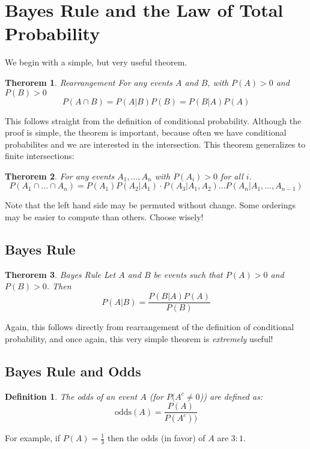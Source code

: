 \documentclass[12pt]{article} %
\newtheorem{defn}{Definition}
\newtheorem{thm}{Therorem}
\begin{document}
\section{Bayes Rule and the Law of Total Probability}
We begin with a simple, but very useful theorem.\\

\begin{thm}{Rearrangement}
For any events $A$ and $B$, with $P(A)>0$ and $P(B)>0$
$$P(A\cap B) = P(A|B)P(B) = P(B|A)P(A)$$
\end{thm}
This follows straight from the definition of conditional probability. Although the proof is simple, the theorem is important, because often we have conditional probabilites and we are interested in the intersection. This theorem generalizes to finite intersections:
\begin{thm}
For any events $A_1,...,A_n$ with $P(A_i)>0$ for all $i$.
$$P(A_1\cap...\cap A_n) = P(A_1)P(A_2|A_1)\cdot P(A_3|A_1,A_2)...P(A_n|A_1,...,A_{n-1})$$
\end{thm}
Note that the left hand side may be permuted without change. Some orderings may be easier to compute than others. Choose wisely!
\subsection{Bayes Rule}
\begin{thm}{Bayes Rule}
Let $A$ and $B$ be events such that $P(A)>0$ and $P(B)>0$. Then
$$P(A|B) = \frac{P(B|A)P(A)}{P(B)}$$
\end{thm}
Again, this follows directly from rearrangement of the definition of conditional probability, and once again, this very simple theorem is \emph{extremely} useful!
\subsection{Bayes Rule and Odds} 
\begin{defn}
The odds of an event $A$ (for $P(A^c\neq 0$)) are defined as:
$$\textrm{odds}(A) = \frac{P(A)}{P(A^c))}$$

\end{defn}
For example, if $P(A)=\frac13$ then the odds (in favor) of $A$ are $3:1$.\\
\end{document}
